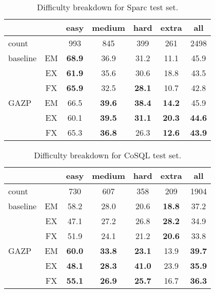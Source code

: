 \documentclass[11pt,a4paper]{article}
\begin{document}
\begin{table}[ht]
\centering
\addtolength{\tabcolsep}{-1.7pt}
\begin{tabular}{@{}lcccccc@{}}
\toprule
         &    & easy & medium & hard & extra & all  \\ \midrule
count    &    & 993  & 845    & 399  & 261   & 2498 \\ \midrule
baseline & EM & \textbf{68.9} & 36.9   & 31.2 & 11.1  & 45.9 \\
         & EX & \textbf{61.9} & 35.6   & 30.6 & 18.8  & 43.5 \\
         & FX & \textbf{65.9} & 32.5   & \textbf{28.1} & 10.7  & 42.8 \\ \midrule
GAZP     & EM & 66.5 & \textbf{39.6}   & \textbf{38.4} & \textbf{14.2}  & 45.9 \\
         & EX & 60.1 & \textbf{39.5}   & \textbf{31.1} & \textbf{20.3}  & \textbf{44.6} \\
         & FX & 65.3 & \textbf{36.8}   & 26.3 & \textbf{12.6}  & \textbf{43.9} \\ \bottomrule
\end{tabular}
\caption{Difficulty breakdown for Sparc test set.}
\label{tab:breakdown-sparc}
\end{table}

\begin{table}[ht]
\centering
\addtolength{\tabcolsep}{-1.7pt}
\begin{tabular}{@{}lcccccc@{}}
\toprule
         &    & easy & medium & hard & extra & all  \\ \midrule
count    &    & 730  & 607    & 358  & 209   & 1904 \\ \midrule
baseline & EM & 58.2 & 28.0   & 20.6 & \textbf{18.8}  & 37.2 \\
         & EX & 47.1 & 27.2   & 26.8 & \textbf{28.2}  & 34.9 \\
         & FX & 51.9 & 24.1   & 21.2 & \textbf{20.6}  & 33.8 \\ \midrule
GAZP     & EM & \textbf{60.0} & \textbf{33.8}   & \textbf{23.1} & 13.9  & \textbf{39.7} \\
         & EX & \textbf{48.1} & \textbf{28.3}   & \textbf{41.0} & 23.9  & \textbf{35.9} \\
         & FX & \textbf{55.1} & \textbf{26.9}   & \textbf{25.7} & 16.7  & \textbf{36.3} \\ \bottomrule
\end{tabular}
\caption{Difficulty breakdown for CoSQL test set.}
\label{tab:breakdown-cosql}
\end{table}
\end{document}
